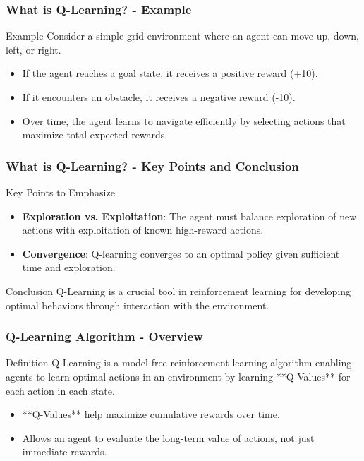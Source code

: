 \documentclass[aspectratio=169]{beamer}
\begin{document}
\begin{frame}[fragile]
    \frametitle{What is Q-Learning? - Example}
    \begin{block}{Example}
        Consider a simple grid environment where an agent can move up, down, left, or right. 
        \begin{itemize}
            \item If the agent reaches a goal state, it receives a positive reward (+10).
            \item If it encounters an obstacle, it receives a negative reward (-10).
        \end{itemize}
    \end{block}
    \begin{itemize}
        \item Over time, the agent learns to navigate efficiently by selecting actions that maximize total expected rewards.
    \end{itemize}
\end{frame}

\begin{frame}[fragile]
    \frametitle{What is Q-Learning? - Key Points and Conclusion}
    \begin{block}{Key Points to Emphasize}
        \begin{itemize}
            \item \textbf{Exploration vs. Exploitation}: The agent must balance exploration of new actions with exploitation of known high-reward actions.
            \item \textbf{Convergence}: Q-learning converges to an optimal policy given sufficient time and exploration.
        \end{itemize}
    \end{block}
    \begin{block}{Conclusion}
        Q-Learning is a crucial tool in reinforcement learning for developing optimal behaviors through interaction with the environment.
    \end{block}
\end{frame}

\begin{frame}[fragile]
    \frametitle{Q-Learning Algorithm - Overview}
    \begin{block}{Definition}
        Q-Learning is a model-free reinforcement learning algorithm enabling agents to learn optimal actions in an environment by learning **Q-Values** for each action in each state.
    \end{block}
    \begin{itemize}
        \item **Q-Values** help maximize cumulative rewards over time.
        \item Allows an agent to evaluate the long-term value of actions, not just immediate rewards.
    \end{itemize}
\end{frame}
\end{document}
